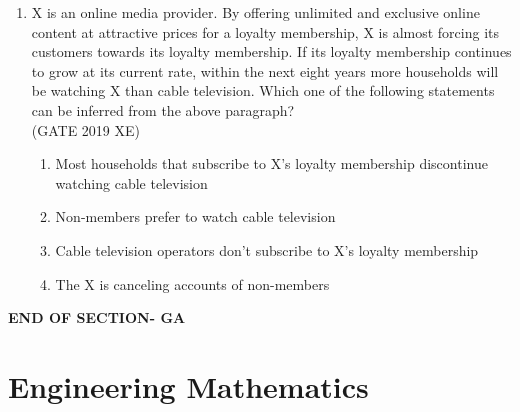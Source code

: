 \documentclass[journal,12pt,onecolumn]{IEEEtran}
\begin{document}
\begin{enumerate}
\item X is an online media provider. By offering unlimited and exclusive online content at attractive prices for a loyalty membership, X is almost forcing its customers towards its loyalty membership. If its loyalty membership continues to grow at its current rate, within the next eight years more households will be watching X than cable television. Which one of the following statements can be inferred from the above paragraph?\\
\hfill{(GATE 2019 XE)} 
\begin{multicols}{2}
\begin{enumerate}
\item Most households that subscribe to X’s loyalty membership discontinue watching cable television
\item Non-members prefer to watch cable television
\item Cable television operators don’t subscribe to X’s loyalty membership
\item The X is canceling accounts of non-members
\end{enumerate}
\end{multicols}
\end{enumerate}

\begin{center}
    \item[\textbf{END OF SECTION- GA}]
\end{center}



\newpage
\section*{Engineering Mathematics}
\noindent
\bigskip
\end{document}

